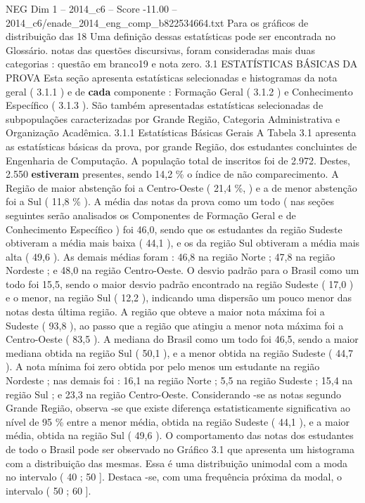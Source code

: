 \begin{textsample}{NEG Dim 1 – 2014\_c6 – Score -11.00 – 2014\_c6/enade\_2014\_eng\_comp\_b822534664.txt}
Para os gráficos de distribuição das 18 Uma definição dessas estatísticas pode ser encontrada no Glossário. notas das questões discursivas, foram consideradas mais duas categorias : questão em branco19 e nota zero. 3.1 ESTATÍSTICAS BÁSICAS DA PROVA Esta seção apresenta estatísticas selecionadas e histogramas da nota geral ( 3.1.1 ) e de \textbf{cada} componente : Formação Geral ( 3.1.2 ) e Conhecimento Específico ( 3.1.3 ).
São também apresentadas estatísticas selecionadas de subpopulações caracterizadas por Grande Região, Categoria Administrativa e Organização Acadêmica. 3.1.1 Estatísticas Básicas Gerais A Tabela 3.1 apresenta as estatísticas básicas da prova, por grande Região, dos estudantes concluintes de Engenharia de Computação.
A população total de inscritos foi de 2.972.
Destes, 2.550 \textbf{estiveram} presentes, sendo 14,2 \% o índice de não comparecimento.
A Região de maior abstenção foi a Centro-Oeste ( 21,4 \%, ) e a de menor abstenção foi a Sul ( 11,8 \% ).
A média das notas da prova como um todo ( nas seções seguintes serão analisados os Componentes de Formação Geral e de Conhecimento Específico ) foi 46,0, sendo que os estudantes da região Sudeste obtiveram a média mais baixa ( 44,1 ), e os da região Sul obtiveram a média mais alta ( 49,6 ).
As demais médias foram : 46,8 na região Norte ; 47,8 na região Nordeste ; e 48,0 na região Centro-Oeste.
O desvio padrão para o Brasil como um todo foi 15,5, sendo o maior desvio padrão encontrado na região Sudeste ( 17,0 ) e o menor, na região Sul ( 12,2 ), indicando uma dispersão um pouco menor das notas desta última região.
A região que obteve a maior nota máxima foi a Sudeste ( 93,8 ), ao passo que a região que atingiu a menor nota máxima foi a Centro-Oeste ( 83,5 ).
A mediana do Brasil como um todo foi 46,5, sendo a maior mediana obtida na região Sul ( 50,1 ), e a menor obtida na região Sudeste ( 44,7 ).
A nota mínima foi zero obtida por pelo menos um estudante na região Nordeste ; nas demais foi : 16,1 na região Norte ; 5,5 na região Sudeste ; 15,4 na região Sul ; e 23,3 na região Centro-Oeste.
Considerando -se as notas segundo Grande Região, observa -se que existe diferença estatisticamente significativa ao nível de 95 \% entre a menor média, obtida na região Sudeste ( 44,1 ), e a maior média, obtida na região Sul ( 49,6 ).
O comportamento das notas dos estudantes de todo o Brasil pode ser observado no Gráfico 3.1 que apresenta um histograma com a distribuição das mesmas.
Essa é uma distribuição unimodal com a moda no intervalo ( 40 ; 50 ].
Destaca -se, com uma frequência próxima da modal, o intervalo ( 50 ; 60 ].

\end{textsample}
